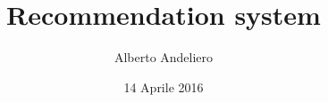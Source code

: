 \documentclass{beamer}
\author{Alberto Andeliero}
\title[Recommendation system]{Recommendation system}
\date{14 Aprile 2016}
\begin{document}
\titlepageframe %















%
%
%
%
%
%
\end{document}
